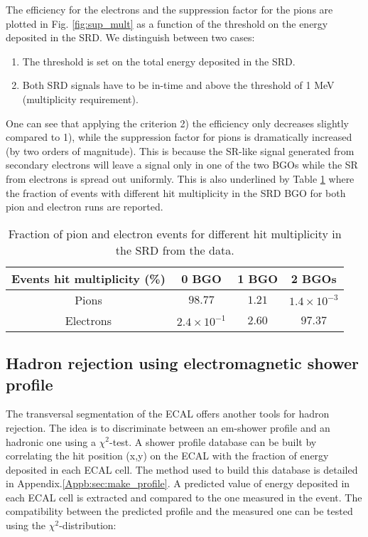 The efficiency for the electrons and the suppression factor for the pions are plotted in Fig. \ref{fig:sup_mult} as a function of the threshold on the energy deposited in the SRD. We distinguish between two cases:
\begin{enumerate}
\item The threshold is set on the total energy deposited in the SRD.
\item Both SRD signals have to be in-time and above the threshold of 1 MeV (multiplicity requirement).
\end{enumerate}
One can see that applying the criterion 2) the efficiency only decreases slightly compared to 1), while the suppression factor for pions is dramatically increased (by two orders of magnitude).
This is because the SR-like signal generated from secondary electrons will leave a signal only in one of the two BGOs while the SR from electrons is spread out uniformly.
This is also underlined by Table  \ref{tab:hits} where the fraction of events with different hit multiplicity in the SRD BGO for both pion and electron runs are reported.

\begin{table}[hbt!]
\begin{center}
\begin{tabular}{cccc}
Events hit multiplicity  (\%) & 0 BGO  & 1 BGO & 2 BGOs\\
\hline
Pions & $98.77$ & $1.21$ & $1.4\times10^{-3}$  \\
Electrons & $2.4\times10^{-1}$  & $2.60$ & $97.37$ \\
\end{tabular}
\end{center}
\caption[Fraction of pion and electron events for different hit multiplicity in the SRD from the data]{Fraction of pion and electron events for different hit multiplicity in the SRD from the data.}
\label{tab:hits}

\end{table}

\subsection{Hadron rejection using electromagnetic shower profile}
\label{ch3:sec:bkg-ecal-profile}

The transversal segmentation of the ECAL offers another tools for hadron rejection. The idea is to discriminate between an em-shower profile and an hadronic one  using a $\chi^2$-test. A shower profile database can be built by correlating the hit position (x,y) on the ECAL with the fraction of energy deposited in each ECAL cell. The method used to build this database is detailed in Appendix.\ref{Appb:sec:make_profile}. A predicted value of energy deposited in each ECAL cell is extracted and compared to the one measured in the event. The compatibility between the predicted profile and the measured one can be tested using the $\chi^2$-distribution:

